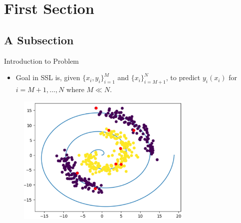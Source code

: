 \section{First Section}

\subsection{A Subsection}
	\begin{frame}{Introduction to Problem}
		\begin{itemize}
			\item Goal in SSL is, given $\{x_i,y_i\}_{i=1}^{M}$ and $\{x_i\}_{i=M+1}^{N}$, to predict $y_i(x_i)$ for $i=M+1, \dots , N$ where $M \ll N$.
		\end{itemize}
		\begin{figure}[H]
			\centering
			\hspace*{0cm}\includegraphics[width=0.75\textwidth,height=\textwidth,keepaspectratio]{Figures/SpiOg.png}
		\end{figure}
	\end{frame}

